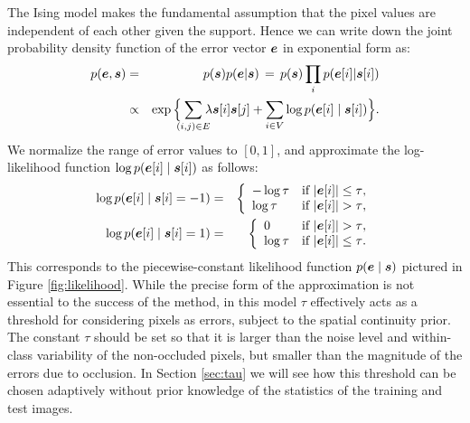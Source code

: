 The Ising model makes the fundamental assumption that the pixel values are independent of each other given the support. Hence we can write down the joint probability density function of the error vector $\boldsymbol{e}$ in exponential form as:
\begin{eqnarray*}
p(\e,\s) &=& p(\s) p(\e|\s) \,=\, p(\s) \prod_i p(\e[i]|\s[i]) \\
&\propto&  \exp\Big\{\hspace{-2mm}\sum_{(i,j)\in E} \hspace{-2mm}\lambda\s[i]\s[j] +
\sum_{i\in V} \log p(\e[i] \mid \s[i]) \Big\}.
\end{eqnarray*}
We normalize the range of error values to $[0,1]$, and approximate the log-likelihood function $\log p(\boldsymbol{e}[i]\mid\boldsymbol{s}[i])$ as follows:
\begin{eqnarray*}
\log p(\boldsymbol{e}[i] \mid \boldsymbol{s}[i]=-1) &=& \left\{ \begin{array}{ll}
-\log \tau & \textrm{if $|\boldsymbol{e}[i]| \le \tau$},\\
\log \tau & \textrm{if $|\boldsymbol{e}[i]| >\tau$},
\end{array} \right. \\
\log p(\boldsymbol{e}[i] \mid \boldsymbol{s}[i]=1) &=& \left\{ \begin{array}{ll}
0 & \textrm{if $|\boldsymbol{e}[i]| > \tau$},\\
\log \tau & \textrm{if $|\boldsymbol{e}[i]| \le \tau$}.
\end{array} \right.
\end{eqnarray*}
This corresponds to the piecewise-constant likelihood function $p(\boldsymbol{e}\mid \boldsymbol{s})$ pictured in Figure \ref{fig:likelihood}. While the precise form of the approximation is not essential to the success of the method, in this model $\tau$ effectively acts as a threshold for considering pixels as errors, subject to the spatial continuity prior. The constant $\tau$ should be set so that it is larger than the noise level and within-class variability of the non-occluded pixels, but smaller than the magnitude of the errors due to occlusion.  In Section \ref{sec:tau} we will see how this threshold can be chosen adaptively without prior knowledge of the statistics of the training and test images.

